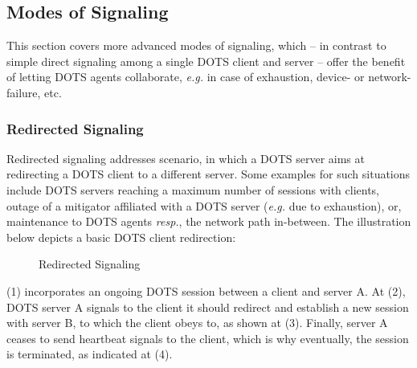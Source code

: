 \subsection{Modes of Signaling}
This section covers more advanced modes of signaling, which -- in contrast to simple direct signaling among a single DOTS client and server -- offer the benefit of letting DOTS agents collaborate, \emph{e.g.} in case of exhaustion, device- or network-failure, etc.

\subsubsection{Redirected Signaling}
Redirected signaling addresses scenario, in which a DOTS server aims at redirecting a DOTS client to a different server. Some examples for such situations include DOTS servers reaching a maximum number of sessions with clients, outage of a mitigator affiliated with a DOTS server (\emph{e.g.} due to exhaustion), or, maintenance to DOTS agents \emph{resp.}, the network path in-between. The illustration below depicts a basic DOTS client redirection:

\begin{figure}[H]
\label{fig:redirectedSignaling}
\centering
\caption{Redirected Signaling \cite{dots-architecture}}
\end{figure}

(1) incorporates an ongoing DOTS session between a client and server A. At (2), DOTS server A signals to the client it should redirect and establish a new session with server B, to which the client obeys to, as shown at (3). Finally, server A ceases to send heartbeat signals to the client, which is why eventually, the session is terminated, as indicated at (4).


